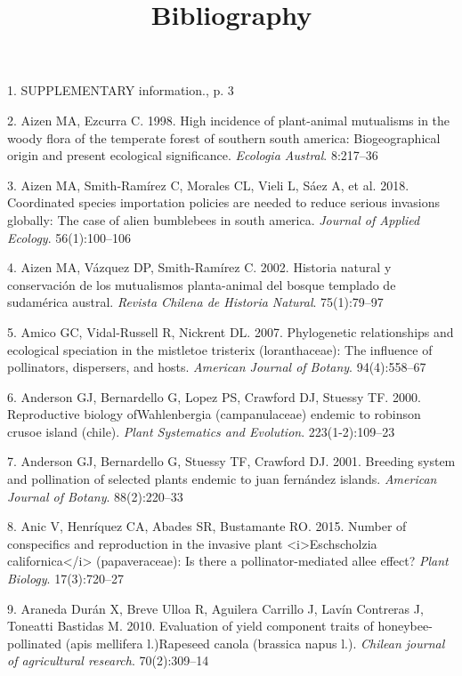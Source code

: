 \documentclass[
]{article}
\title{Bibliography}
\author{}
\date{\vspace{-2.5em}}
\begin{document}
\maketitle

\hypertarget{refs}{}
\leavevmode\hypertarget{ref-RN165}{}%
1. SUPPLEMENTARY information., p. 3

\leavevmode\hypertarget{ref-RN6}{}%
2. Aizen MA, Ezcurra C. 1998. High incidence of plant-animal mutualisms
in the woody flora of the temperate forest of southern south america:
Biogeographical origin and present ecological significance.
\emph{Ecologia Austral}. 8:217--36

\leavevmode\hypertarget{ref-RN8}{}%
3. Aizen MA, Smith‐Ramírez C, Morales CL, Vieli L, Sáez A, et al. 2018.
Coordinated species importation policies are needed to reduce serious
invasions globally: The case of alien bumblebees in south america.
\emph{Journal of Applied Ecology}. 56(1):100--106

\leavevmode\hypertarget{ref-RN7}{}%
4. Aizen MA, Vázquez DP, Smith-Ramírez C. 2002. Historia natural y
conservación de los mutualismos planta-animal del bosque templado de
sudamérica austral. \emph{Revista Chilena de Historia Natural}.
75(1):79--97

\leavevmode\hypertarget{ref-RN9}{}%
5. Amico GC, Vidal-Russell R, Nickrent DL. 2007. Phylogenetic
relationships and ecological speciation in the mistletoe tristerix
(loranthaceae): The influence of pollinators, dispersers, and hosts.
\emph{American Journal of Botany}. 94(4):558--67

\leavevmode\hypertarget{ref-RN10}{}%
6. Anderson GJ, Bernardello G, Lopez PS, Crawford DJ, Stuessy TF. 2000.
Reproductive biology ofWahlenbergia (campanulaceae) endemic to robinson
crusoe island (chile). \emph{Plant Systematics and Evolution}.
223(1-2):109--23

\leavevmode\hypertarget{ref-RN3}{}%
7. Anderson GJ, Bernardello G, Stuessy TF, Crawford DJ. 2001. Breeding
system and pollination of selected plants endemic to juan fernández
islands. \emph{American Journal of Botany}. 88(2):220--33

\leavevmode\hypertarget{ref-RN101}{}%
8. Anic V, Henríquez CA, Abades SR, Bustamante RO. 2015. Number of
conspecifics and reproduction in the invasive plant
\textless i\textgreater Eschscholzia
californica\textless/i\textgreater{} (papaveraceae): Is there a
pollinator-mediated allee effect? \emph{Plant Biology}. 17(3):720--27

\leavevmode\hypertarget{ref-RN12}{}%
9. Araneda Durán X, Breve Ulloa R, Aguilera Carrillo J, Lavín Contreras
J, Toneatti Bastidas M. 2010. Evaluation of yield component traits of
honeybee-pollinated (apis mellifera l.)Rapeseed canola (brassica napus
l.). \emph{Chilean journal of agricultural research}. 70(2):309--14
\end{document}
